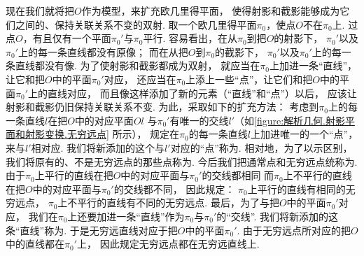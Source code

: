 现在我们就将把\(O\)作为模型，来扩充欧几里得平面，
使得射影和截影能够成为它们之间的、保持关联关系不变的双射.
取一个欧几里得平面\(\pi_0\)，使点\(O\)不在\(\pi_0\)上.
过点\(O\)，有且仅有一个平面\(\pi_0'\)与\(\pi_0\)平行.
容易看出，在从\(\pi_0\)到把\(O\)的射影下，
\(\pi_0'\)以及\(\pi_0'\)上的每一条直线都没有原像；
而在从把\(O\)到\(\pi_0\)的截影下，
\(\pi_0'\)以及\(\pi_0'\)上的每一条直线都没有像.
为了使射影和截影都成为双射，
就应当在\(\pi_0\)上加进一条“直线”，让它和把\(O\)中的平面\(\pi_0'\)对应，
还应当在\(\pi_0\)上添上一些“点”，让它们和把\(O\)中的平面\(\pi_0'\)上的直线对应，
而且像这样添加了新的元素（“直线”和“点”）以后，
应该让射影和截影仍旧保持关联关系不变.
为此，采取如下的扩充方法：
考虑到\(\pi_0\)上的每一条直线\(l\)在把\(O\)中的对应平面\(Ol\)
与\(\pi_0'\)有唯一的交线\(l'\)（如\cref{figure:解析几何.射影平面和射影变换.无穷远点} 所示），
规定在\(\pi_0\)的每一条直线\(l\)上加进唯一的一个“点”，来与\(l'\)相对应.
我们将新添加的这个与\(l'\)对应的“点”称为.
相对地，为了以示区别，我们将原有的、不是无穷远点的那些点称为.
今后我们把通常点和无穷远点统称为.
由于\(\pi_0\)上平行的直线在把\(O\)中的对应平面与\(\pi_0'\)的交线都相同
而\(\pi_0\)上不平行的直线在把\(O\)中的对应平面与\(\pi_0'\)的交线都不同，
因此规定：
\(\pi_0\)上平行的直线有相同的无穷远点，
\(\pi_0\)上不平行的直线有不同的无穷远点.
最后，为了与把\(O\)中的平面\(\pi_0'\)对应，
我们在\(\pi_0\)上还要加进一条“直线”作为\(\pi_0\)与\(\pi_0'\)的“交线”.
我们将新添加的这条“直线”称为.
于是无穷远直线对应于把\(O\)中的平面\(\pi_0'\).
由于无穷远点所对应的把\(O\)中的直线都在\(\pi_0'\)上，
因此规定无穷远点都在无穷远直线上.

